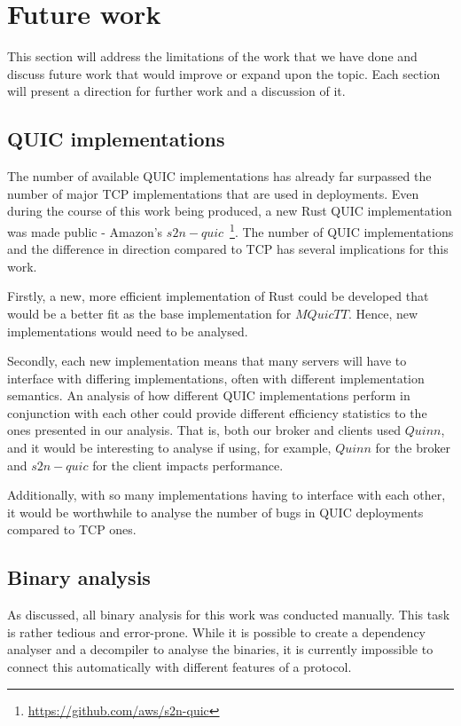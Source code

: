 \section{Future work} \label{sec:future_work}

This section will address the limitations of the work that we have done and discuss future work that would improve or expand upon the topic.
Each section will present a direction for further work and a discussion of it.

\subsection{QUIC implementations}

The number of available QUIC implementations has already far surpassed the number of major TCP implementations that are used in deployments.
Even during the course of this work being produced, a new Rust QUIC implementation was made public - Amazon's $s2n-quic$~\footnote{\url{https://github.com/aws/s2n-quic}}.
The number of QUIC implementations and the difference in direction compared to TCP has several implications for this work.

Firstly, a new, more efficient implementation of Rust could be developed that would be a better fit as the base implementation for $MQuicTT$.
Hence, new implementations would need to be analysed.

Secondly, each new implementation means that many servers will have to interface with differing implementations, often with different implementation semantics.
An analysis of how different QUIC implementations perform in conjunction with each other could provide different efficiency statistics to the ones presented in our analysis.
That is, both our broker and clients used $Quinn$, and it would be interesting to analyse if using, for example, $Quinn$ for the broker and $s2n-quic$ for the client impacts performance.

Additionally, with so many implementations having to interface with each other, it would be worthwhile to analyse the number of bugs in QUIC deployments compared to TCP ones.

\subsection{Binary analysis}

As discussed, all binary analysis for this work was conducted manually.
This task is rather tedious and error-prone.
While it is possible to create a dependency analyser and a decompiler to analyse the binaries, it is currently impossible to connect this automatically with different features of a protocol.

